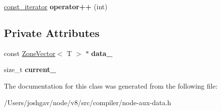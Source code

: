 \begin{DoxyCompactItemize}
\item 
\hyperlink{classv8_1_1internal_1_1compiler_1_1_node_aux_data_1_1const__iterator}{const\+\_\+iterator} {\bfseries operator++} (int)\hypertarget{classv8_1_1internal_1_1compiler_1_1_node_aux_data_1_1const__iterator_ae74f23791395f92d491f1f3d47577726}{}\label{classv8_1_1internal_1_1compiler_1_1_node_aux_data_1_1const__iterator_ae74f23791395f92d491f1f3d47577726}

\end{DoxyCompactItemize}
\subsection*{Private Attributes}
\begin{DoxyCompactItemize}
\item 
const \hyperlink{classv8_1_1internal_1_1_zone_vector}{Zone\+Vector}$<$ T $>$ $\ast$ {\bfseries data\+\_\+}\hypertarget{classv8_1_1internal_1_1compiler_1_1_node_aux_data_1_1const__iterator_aa59feda70d2a555a17104094e9dadd27}{}\label{classv8_1_1internal_1_1compiler_1_1_node_aux_data_1_1const__iterator_aa59feda70d2a555a17104094e9dadd27}

\item 
size\+\_\+t {\bfseries current\+\_\+}\hypertarget{classv8_1_1internal_1_1compiler_1_1_node_aux_data_1_1const__iterator_a1e08c372bba4726d45e9c5df0b60098a}{}\label{classv8_1_1internal_1_1compiler_1_1_node_aux_data_1_1const__iterator_a1e08c372bba4726d45e9c5df0b60098a}

\end{DoxyCompactItemize}


The documentation for this class was generated from the following file\+:\begin{DoxyCompactItemize}
\item 
/\+Users/joshgav/node/v8/src/compiler/node-\/aux-\/data.\+h\end{DoxyCompactItemize}
